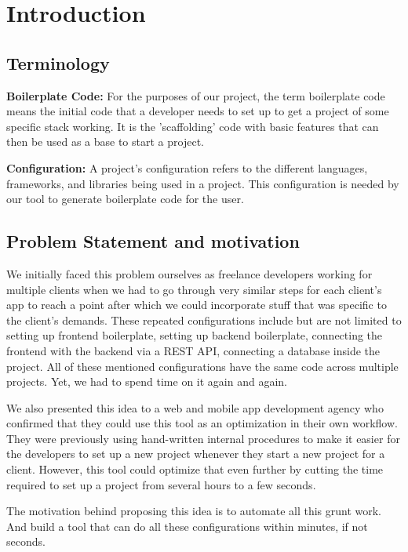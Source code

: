 \section{Introduction}

\subsection{Terminology}

\textbf{Boilerplate Code:} For the purposes of our project, the term boilerplate code means the initial code that a developer needs to set up to get a project of some specific stack working. It is the 'scaffolding' code with basic features that can then be used as a base to start a project.

\textbf{Configuration:} A project's configuration refers to the different languages, frameworks, and libraries being used in a project. This configuration is needed by our tool to generate boilerplate code for the user.

\subsection{Problem Statement and motivation}

We initially faced this problem ourselves as freelance developers working for multiple clients when we had to go through very similar steps for each client's app to reach a point after which we could incorporate stuff that was specific to the client's demands. These repeated configurations include but are not limited to setting up frontend boilerplate, setting up backend boilerplate, connecting the frontend with the backend via a REST API, connecting a database inside the project. All of these mentioned configurations have the same code across multiple projects. Yet, we had to spend time on it again and again.

We also presented this idea to a web and mobile app development agency who confirmed that they could use this tool as an optimization in their own workflow. They were previously using hand-written internal procedures to make it easier for the developers to set up a new project whenever they start a new project for a client. However, this tool could optimize that even further by cutting the time required to set up a project from several hours to a few seconds.

The motivation behind proposing this idea is to automate all this grunt work. And build a tool that can do all these configurations within minutes, if not seconds.

